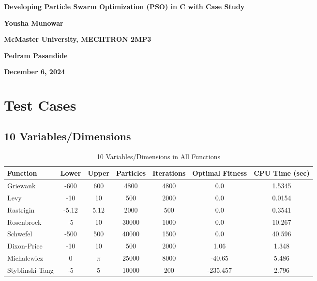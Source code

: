 \documentclass[12pt]{article}
\begin{document}
\justifying

\begin{center}
    \textbf{{\large Developing Particle Swarm Optimization (PSO) in C with Case Study}}

    \textbf{Yousha Munowar}

    \textbf{McMaster University, MECHTRON 2MP3}
    
    \textbf{Pedram Pasandide}

    \textbf{December 6, 2024}
\end{center}

\section{Test Cases}

\subsection{10 Variables/Dimensions}
\begin{table}[H]
    \caption{10 Variables/Dimensions in All Functions}
    \centering
    \begin{tabular}{l c c c c c c}
        \hline
        Function & Lower & Upper & Particles & Iterations & Optimal Fitness & CPU Time (sec) \\
        \hline
        Griewank       & -600  & 600  & 4800  & 4800  & 0.0       & 1.5345 \\
        Levy           & -10   & 10   & 500   & 2000  & 0.0       & 0.0154 \\
        Rastrigin      & -5.12 & 5.12 & 2000  & 500   & 0.0       & 0.3541 \\
        Rosenbrock     & -5    & 10   & 30000 & 1000  & 0.0       & 10.267 \\
        Schwefel       & -500  & 500  & 40000 & 1500  & 0.0       & 40.596 \\
        Dixon-Price    & -10   & 10   & 500   & 2000  & 1.06      & 1.348 \\
        Michalewicz    & 0     & $\pi$ & 25000 & 8000  & -40.65    & 5.486 \\
        Styblinski-Tang & -5   & 5    & 10000 & 200   & -235.457  & 2.796 \\
        \hline
    \end{tabular}
\end{table}
\end{document}
